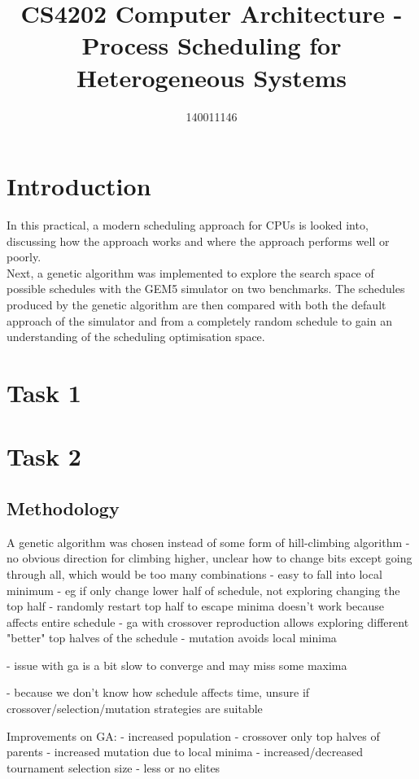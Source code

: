 \documentclass{article}
\title{CS4202 Computer Architecture - Process Scheduling for Heterogeneous Systems}
\author{140011146}
\newcommand{\n}[0]{\\[\baselineskip]}
\begin{document}
\maketitle

\section{Introduction}
In this practical, a modern scheduling approach for CPUs is looked into, discussing how the approach works and where the approach performs well or poorly. 
\n
Next, a genetic algorithm was implemented to explore the search space of possible schedules with the GEM5 simulator on two benchmarks. The schedules produced by the genetic algorithm are then compared with both the default approach of the simulator and from a completely random schedule to gain an understanding of the scheduling optimisation space.

\section{Task 1}

\section{Task 2}

\subsection{Methodology}
A genetic algorithm was chosen instead of some form of hill-climbing algorithm
- no obvious direction for climbing  higher, unclear how to change bits except going through all, which would be too many combinations
- easy to fall into local minimum 
- eg if only change lower half of schedule, not exploring changing the top half
- randomly restart top half to escape minima doesn't work because affects entire schedule
- ga with crossover reproduction allows exploring different "better" top halves of the schedule
- mutation avoids local minima

- issue with ga is a bit slow to converge and may miss some maxima

- because we don't know how schedule affects time, unsure if crossover/selection/mutation strategies are suitable

Improvements on GA:
- increased population
- crossover only top halves of parents
- increased mutation due to local minima
- increased/decreased tournament selection size
- less or no elites
\end{document}
